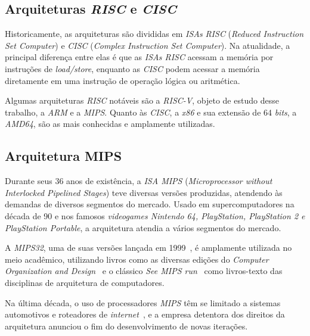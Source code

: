     \subsection{Arquiteturas \textit{RISC} e \textit{CISC}}
    { Historicamente, as arquiteturas são divididas em \textit{ISAs} \textit{RISC}
        (\textit{Reduced Instruction Set Computer}) e \textit{CISC}
        (\textit{Complex Instruction Set Computer}).  Na atualidade, a principal
        diferença entre elas é que as \textit{ISAs RISC} acessam a memória por
        instruções de \textit{load/store}, enquanto as \textit{CISC} podem acessar
        a memória diretamente em uma instrução de operação lógica ou
        aritmética.~\cite{risc_cisc_wars}
    }

    { Algumas arquiteturas \textit{RISC} notáveis são a \textit{RISC-V}, objeto de
        estudo desse trabalho, a \textit{ARM} e a \textit{MIPS}. Quanto às
        \textit{CISC}, a \textit{x86} e sua extensão de 64 \textit{bits}, a
        \textit{AMD64}, são as mais conhecidas e amplamente utilizadas.
    }

    \subsection{Arquitetura MIPS}
    { Durante seus 36 anos de existência, a \textit{ISA MIPS} (\textit{Microprocessor
        without Interlocked Pipelined Stages}) teve diversas versões produzidas,
        atendendo às demandas de diversos segmentos do mercado. Usado em
        supercomputadores na década de 90 e nos famosos \textit{videogames
        Nintendo 64, PlayStation, PlayStation 2 e PlayStation Portable}, a
        arquitetura atendia a vários segmentos do mercado.
    }

    { A \textit{MIPS32}, uma de suas versões lançada em 1999~\cite{mips32_1999},
        é amplamente utilizada no meio acadêmico, utilizando livros como as
        diversas edições do \textit{Computer Organization and
        Design}~\cite{patterson2014computer} e o clássico
        \textit{See MIPS run}~\cite{sweetman1999see} como livros-texto das
        disciplinas de arquitetura de computadores.
    }

    { Na última década, o uso de processadores \textit{MIPS} têm se limitado a
        sistemas automotivos e roteadores de \textit{internet}~\cite{mips_uses_wiki},
        e a empresa detentora dos direitos da arquitetura anunciou o fim do
        desenvolvimento de novas iterações.~\cite{wave_comp_bankrupt}
    }

